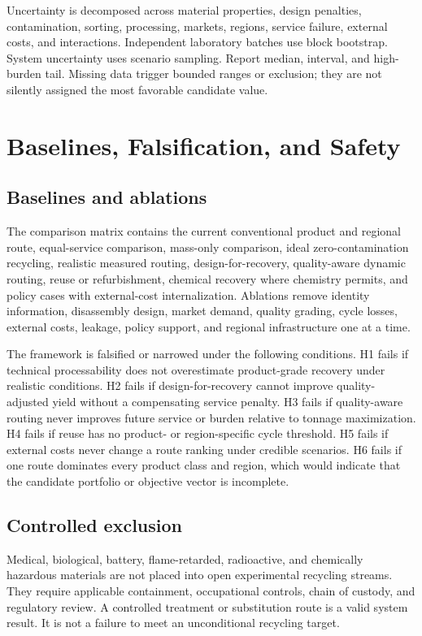 \documentclass[conference]{IEEEtran}
\begin{document}
Uncertainty is decomposed across material properties, design penalties, contamination, sorting, processing, markets, regions, service failure, external costs, and interactions. Independent laboratory batches use block bootstrap. System uncertainty uses scenario sampling. Report median, interval, and high-burden tail. Missing data trigger bounded ranges or exclusion; they are not silently assigned the most favorable candidate value.

\section{Baselines, Falsification, and Safety}

\subsection{Baselines and ablations}

The comparison matrix contains the current conventional product and regional route, equal-service comparison, mass-only comparison, ideal zero-contamination recycling, realistic measured routing, design-for-recovery, quality-aware dynamic routing, reuse or refurbishment, chemical recovery where chemistry permits, and policy cases with external-cost internalization. Ablations remove identity information, disassembly design, market demand, quality grading, cycle losses, external costs, leakage, policy support, and regional infrastructure one at a time.

The framework is falsified or narrowed under the following conditions. H1 fails if technical processability does not overestimate product-grade recovery under realistic conditions. H2 fails if design-for-recovery cannot improve quality-adjusted yield without a compensating service penalty. H3 fails if quality-aware routing never improves future service or burden relative to tonnage maximization. H4 fails if reuse has no product- or region-specific cycle threshold. H5 fails if external costs never change a route ranking under credible scenarios. H6 fails if one route dominates every product class and region, which would indicate that the candidate portfolio or objective vector is incomplete.

\subsection{Controlled exclusion}

Medical, biological, battery, flame-retarded, radioactive, and chemically hazardous materials are not placed into open experimental recycling streams. They require applicable containment, occupational controls, chain of custody, and regulatory review. A controlled treatment or substitution route is a valid system result. It is not a failure to meet an unconditional recycling target.
\end{document}
